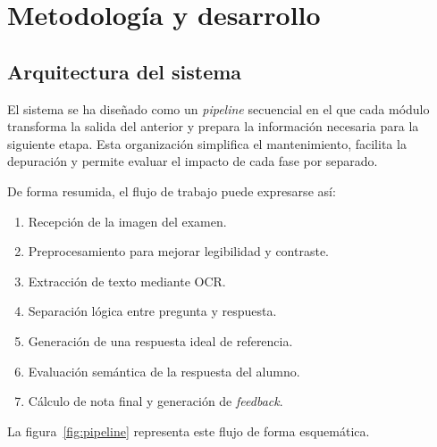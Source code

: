 \chapter{Metodología y desarrollo}
\label{cap:metodologia}

\section{Arquitectura del sistema}

El sistema se ha diseñado como un \emph{pipeline} secuencial en el que cada módulo transforma la salida del anterior y prepara la información necesaria para la siguiente etapa. Esta organización simplifica el mantenimiento, facilita la depuración y permite evaluar el impacto de cada fase por separado.

De forma resumida, el flujo de trabajo puede expresarse así:

\begin{enumerate}[leftmargin=1.6em]
  \item Recepción de la imagen del examen.
  \item Preprocesamiento para mejorar legibilidad y contraste.
  \item Extracción de texto mediante OCR.
  \item Separación lógica entre pregunta y respuesta.
  \item Generación de una respuesta ideal de referencia.
  \item Evaluación semántica de la respuesta del alumno.
  \item Cálculo de nota final y generación de \emph{feedback}.
\end{enumerate}

La figura~\ref{fig:pipeline} representa este flujo de forma esquemática.

